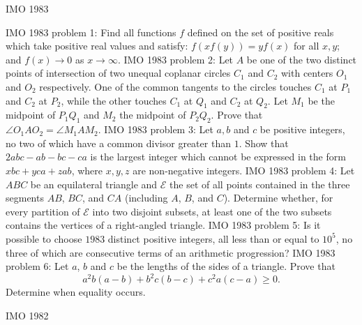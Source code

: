 IMO 1983 

IMO 1983 problem 1:  Find all functions $f$ defined on the set of positive reals which take positive real values and satisfy: $f(xf(y))=yf(x)$ for all $x,y$; and $f(x)\to0$ as $x\to\infty$. 
IMO 1983 problem 2:  Let $A$ be one of the two distinct points of intersection of two unequal coplanar circles $C_1$ and $C_2$ with centers $O_1$ and $O_2$ respectively. One of the common tangents to the circles touches $C_1$ at $P_1$ and $C_2$ at $P_2$, while the other touches $C_1$ at $Q_1$ and $C_2$ at $Q_2$. Let $M_1$ be the midpoint of $P_1Q_1$ and $M_2$ the midpoint of $P_2Q_2$. Prove that $\angle O_1AO_2=\angle M_1AM_2$. 
IMO 1983 problem 3:  Let $a,b$ and $c$ be positive integers, no two of which have a common divisor greater than $1$. Show that $2abc-ab-bc-ca$ is the largest integer which cannot be expressed in the form $xbc+yca+zab$, where $x,y,z$ are non-negative integers. 
IMO 1983 problem 4:  Let $ABC$ be an equilateral triangle and $\mathcal{E}$ the set of all points contained in the three segments $AB$, $BC$, and $CA$ (including $A$, $B$, and $C$).  Determine whether, for every partition of $\mathcal{E}$ into two disjoint subsets, at least one of the two subsets contains the vertices of a right-angled triangle. 
IMO 1983 problem 5:  Is it possible to choose $1983$ distinct positive integers, all less than or equal to $10^5$, no three of which are consecutive terms of an arithmetic progression? 
IMO 1983 problem 6:  Let $ a$, $ b$ and $ c$ be the lengths of the sides of a triangle. Prove that
\[ a^2b(a - b) + b^2c(b - c) + c^2a(c - a)\ge 0. \]
Determine when equality occurs. 

IMO 1982 

